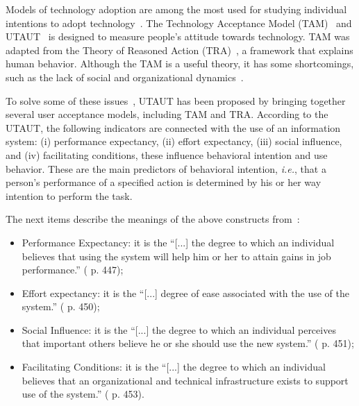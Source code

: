 Models of technology adoption are among the most used for studying individual intentions to adopt technology~\cite{HOEHLE201635, MOORE2022102784}.
The Technology Acceptance Model (TAM)~\cite{RePEc:inm:ormnsc:v:35:y:1989:i:8:p:982-1003} and UTAUT~\cite{10.2307/30036540} is designed to measure people’s attitude towards technology.
TAM was adapted from the Theory of Reasoned Action (TRA)~\cite{AJZEN1991179}, a framework that explains human behavior.
Although the TAM is a useful theory, it has some shortcomings, such as the lack of social and organizational dynamics~\cite{LEGRIS2003191}.

To solve some of these issues~\cite{772658}, UTAUT has been proposed by bringing together several user acceptance models, including TAM and TRA.
According to the UTAUT, the following indicators are connected with the use of an information system:
(i) performance expectancy,
(ii) effort expectancy,
(iii) social influence, and
(iv) facilitating conditions, these influence behavioral intention and use behavior.
These are the main predictors of behavioral intention, {\it i.e.}, that a person’s performance of a specified action is determined by his or her way intention to perform the task.

\vspace{2.00mm}

\noindent
The next items describe the meanings of the above constructs from~\cite{10.2307/30036540}:

\vspace{0.00mm}

\begin{itemize}
\item Performance Expectancy: it is the ``[...] the degree to which an individual believes that using the system will help him or her to attain gains in job performance.'' (\cite{10.2307/30036540} p. 447);
\item Effort expectancy: it is the ``[...] degree of ease associated with the use of the system.'' (\cite{10.2307/30036540} p. 450);
\item Social Influence: it is the ``[...] the degree to which an individual perceives that important others believe he or she should use the new system.'' (\cite{10.2307/30036540} p. 451);
\item Facilitating Conditions: it is the ``[...] the degree to which an individual believes that an organizational and technical infrastructure exists to support use of the system.'' (\cite{10.2307/30036540} p. 453).
\end{itemize}

